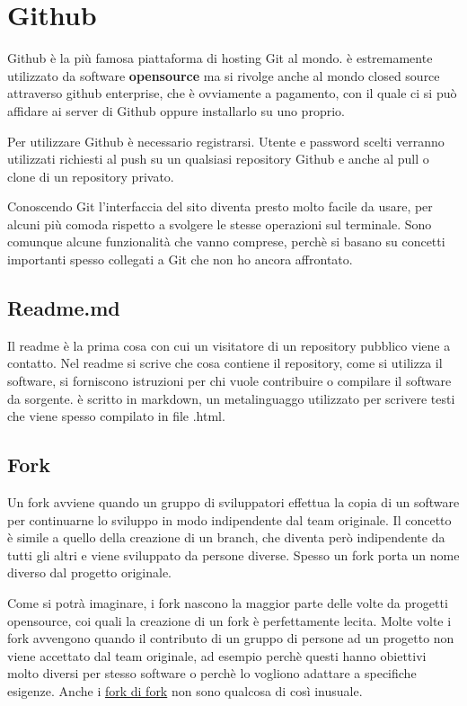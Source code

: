 \documentclass{article} \usepackage[textwidth=19cm,textheight=24cm]{geometry}
\begin{document}
\section{Github\label{github}}

Github è la più famosa piattaforma di hosting Git al mondo. è estremamente
utilizzato da software \textbf{opensource} ma si rivolge anche al mondo closed
source attraverso github enterprise, che è ovviamente a pagamento, con il quale
ci si può affidare ai server di Github oppure installarlo su uno proprio.

Per utilizzare Github è necessario registrarsi. Utente e password scelti
verranno utilizzati richiesti al push su un qualsiasi repository Github e anche
al pull o clone di un repository privato.

Conoscendo Git l'interfaccia del sito diventa presto molto facile da usare, per
alcuni più comoda rispetto a svolgere le stesse operazioni sul terminale.
Sono comunque alcune funzionalità che vanno comprese, perchè si basano su
concetti importanti spesso collegati a Git che non ho ancora affrontato.

\subsection{Readme.md}
Il readme è la prima cosa con cui un visitatore di un repository pubblico viene
a contatto. Nel readme si scrive che cosa contiene il repository, come si
utilizza il software, si forniscono istruzioni per chi vuole contribuire o 
compilare il software da sorgente.
è scritto in markdown, un metalinguaggo utilizzato per scrivere testi che viene
spesso compilato in file .html.

\subsection{Fork}
Un fork avviene quando un gruppo di sviluppatori effettua la copia di un
software per continuarne lo sviluppo in modo indipendente dal team originale. Il
concetto è simile a quello della creazione di un branch, che diventa però
indipendente da tutti gli altri e viene sviluppato da persone diverse.
Spesso un fork porta un nome diverso dal progetto originale.

Come si potrà imaginare, i fork nascono la maggior parte delle volte da progetti
opensource, coi quali la creazione di un fork è perfettamente lecita.
Molte volte i fork avvengono quando il contributo di un gruppo di persone ad un
progetto non viene accettato dal team originale, ad esempio perchè questi
hanno obiettivi molto diversi per stesso software o perchè lo vogliono adattare
a specifiche esigenze.
Anche i 
\href{https://en.wikipedia.org/wiki/Fork_(software_development)#/media/File:Linux_Distribution_Timeline.svg}
{fork di fork}
non sono qualcosa di così inusuale.
\end{document}
